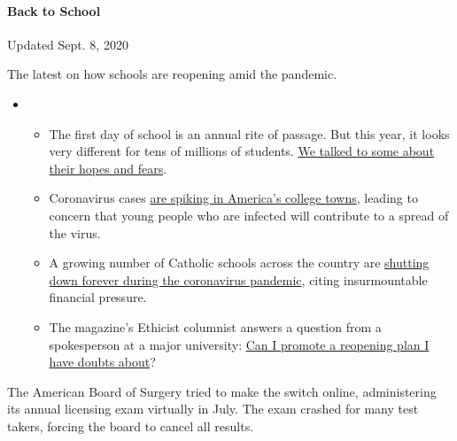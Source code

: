 \hypertarget{back-to-school}{%
\paragraph{Back to School}\label{back-to-school}}

Updated Sept. 8, 2020

The latest on how schools are reopening amid the pandemic.

\begin{itemize}
\item
  \begin{itemize}
  \tightlist
  \item
    The first day of school is an annual rite of passage. But this year,
    it looks very different for tens of millions of students.
    \href{https://www.nytimes3xbfgragh.onion/2020/09/05/us/virtual-return-to-school-covid.html?action=click\&pgtype=Article\&state=default\&region=MAIN_CONTENT_3\&context=storylines_keepup}{We
    talked to some about their hopes and fears}.
  \item
    Coronavirus cases
    \href{https://www.nytimes3xbfgragh.onion/2020/09/06/us/colleges-coronavirus-students.html?action=click\&pgtype=Article\&state=default\&region=MAIN_CONTENT_3\&context=storylines_keepup}{are
    spiking in America's college towns}, leading to concern that young
    people who are infected will contribute to a spread of the virus.
  \item
    A growing number of Catholic schools across the country are
    \href{https://www.nytimes3xbfgragh.onion/2020/09/05/us/catholic-school-closings.html?action=click\&pgtype=Article\&state=default\&region=MAIN_CONTENT_3\&context=storylines_keepup}{shutting
    down forever during the coronavirus pandemic}, citing insurmountable
    financial pressure.
  \item
    The magazine's Ethicist columnist answers a question from a
    spokesperson at a major university:
    \href{https://www.nytimes3xbfgragh.onion/2020/09/08/magazine/university-reopening-safety-ethics.html?action=click\&pgtype=Article\&state=default\&region=MAIN_CONTENT_3\&context=storylines_keepup}{Can
    I promote a reopening plan I have doubts about}?
  \end{itemize}
\end{itemize}

The American Board of Surgery tried to make the switch online,
administering its annual licensing exam virtually in July. The exam
crashed for many test takers, forcing the board to cancel all results.

